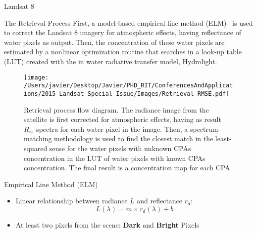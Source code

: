 \documentclass[mathserif]{beamer}
\begin{document}
\begin{frame}{}
\begin{columns}[t]
\begin{column}{.3\linewidth}
\begin{block}{Landsat 8}
\vspace{-.5cm}
\end{block}
\begin{block}{The Retrieval Process}
\justifying\small First, a model-based empirical line method (ELM)~\cite{Concha2014SPIE} is used to correct the Landsat 8 imagery for atmospheric effects, having reflectance of water pixels as output. Then, the concentration of these water pixels are estimated by a nonlinear optimization routine that searches in a look-up table (LUT) created with the in water radiative transfer model, Hydrolight.
\vspace{1cm}   
\begin{center}
\begin{figure}[htbp!]
  \centering
    \texttt{[image: /Users/javier/Desktop/Javier/PHD\_RIT/ConferencesAndApplications/2015\_Landsat\_Special\_Issue/Images/Retrieval\_RMSE.pdf]}
    \caption{Retrieval process flow diagram. The radiance image from the satellite is first corrected for atmospheric effects, having as result $R_{rs}$ spectra for each water pixel in the image. Then, a spectrum-matching methodology is used to find the closest match in the least-squared sense for the water pixels with unknown CPAs concentration in the LUT of water pixels with known CPAs concentration. The final result is a concentration map for each CPA.  \label{fig:retrieval} }
\end{figure}
\end{center}
\end{block}

\begin{block}{Empirical Line Method (ELM)}
\begin{itemize}
  \item \small Linear relationship between radiance $L$ and reflectance $r_d$:
\begin{equation}\label{eq:ELM}
  L(\lambda)=m\times r_d(\lambda)+b
\end{equation}

\vspace{0.005cm}
\item \small At least two pixels from the scene: {\bf \small Dark} and {\bf \small Bright} Pixels

\end{itemize}



\end{block}
\end{column}
\end{columns}
\end{frame}
\end{document}
